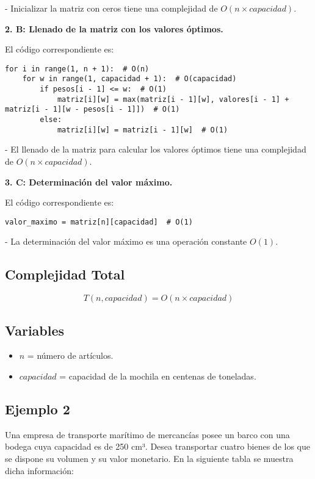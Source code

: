 - Inicializar la matriz con ceros tiene una complejidad de \( O(n \times capacidad) \).

\textbf{2. B: Llenado de la matriz con los valores óptimos.}

El código correspondiente es:
\begin{lstlisting}
for i in range(1, n + 1):  # O(n)
    for w in range(1, capacidad + 1):  # O(capacidad)
        if pesos[i - 1] <= w:  # O(1)
            matriz[i][w] = max(matriz[i - 1][w], valores[i - 1] + matriz[i - 1][w - pesos[i - 1]])  # O(1)
        else:
            matriz[i][w] = matriz[i - 1][w]  # O(1)
\end{lstlisting}

- El llenado de la matriz para calcular los valores óptimos tiene una complejidad de \( O(n \times capacidad) \).

\textbf{3. C: Determinación del valor máximo.}

El código correspondiente es:
\begin{lstlisting}
valor_maximo = matriz[n][capacidad]  # O(1)
\end{lstlisting}

- La determinación del valor máximo es una operación constante \( O(1) \).

\subsection*{Complejidad Total}

\[
T(n, capacidad) = O(n \times capacidad)
\]

\subsection*{Variables}

\begin{itemize}
    \item \( n \) = número de artículos.
    \item \( capacidad \) = capacidad de la mochila en centenas de toneladas.
\end{itemize}

\subsection{Ejemplo 2}
Una empresa de transporte marítimo de mercancías posee un barco con una bodega cuya capacidad es de 250 cm³. Desea transportar cuatro bienes de los que se dispone su volumen y su valor monetario. En la siguiente tabla se muestra dicha información:

